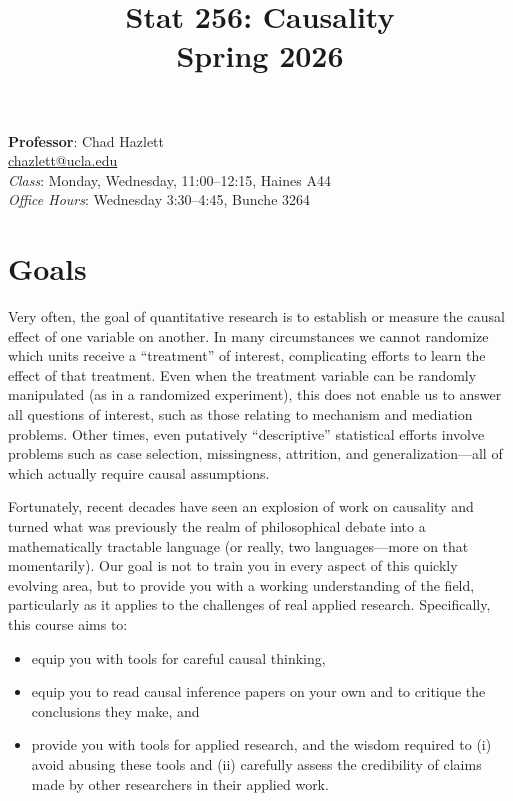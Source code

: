 \documentclass[PS]{syllabus}
\begin{document}
\title{Stat 256: Causality \\ Spring 2026}

\begin{syllabus}
\begin{center}
\vspace{-.5in}
\textbf{Professor}: Chad Hazlett\\
\href{mailto: chazlett@ucla.edu}{chazlett@ucla.edu}  \\
\textit{Class}:  Monday, Wednesday, 11:00--12:15, Haines A44  \\
\textit{Office Hours}:  Wednesday 3:30--4:45, Bunche 3264  \\
\end{center}

\section{Goals}

Very often, the goal of quantitative research is to establish or measure the causal effect of one variable on another. In many circumstances we cannot randomize which units receive a ``treatment'' of interest, complicating efforts to learn the effect of that treatment.  Even when the treatment variable can be randomly manipulated (as in a randomized experiment), this does not enable us to answer all questions of interest, such as those relating to mechanism and mediation problems. Other times, even putatively ``descriptive'' statistical efforts involve problems such as case selection, missingness, attrition, and generalization---all of which actually require causal assumptions.

Fortunately, recent decades have seen an explosion of work on causality and turned what was previously the realm of philosophical debate into a mathematically tractable language (or really, two languages---more on that momentarily). Our goal is not to train you in every aspect of this quickly evolving area, but to provide you with a working understanding of the field, particularly as it applies to the challenges of real applied research. Specifically, this course aims to:
\begin{itemize}
\item equip you with tools for careful causal thinking,
\item equip you to read causal inference papers on your own and to critique the conclusions they make, and
\item provide you with tools for applied research, and the wisdom required to (i) avoid abusing these tools and (ii) carefully assess the credibility of claims made by other researchers in their applied work.
\end{itemize}


\end{syllabus}
\end{document}
